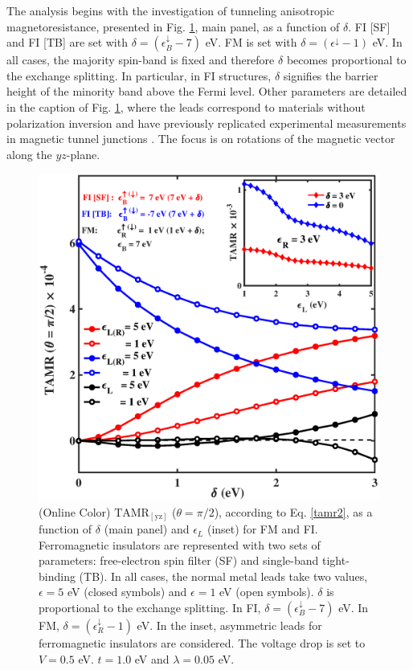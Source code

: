 \documentclass[10pt,pr,twocolumn,showpacs,amssymb,floatfix,superscriptaddress]{revtex4-1}
\newcommand{\eps}{\epsilon}
\newcommand{\lam}{\lambda}
\begin{document}
The analysis begins with the investigation of tunneling anisotropic magnetoresistance, presented in Fig. \ref{fig:figu2}, main panel, as a function of $\delta$. FI [SF] and FI [TB] are set with $\delta = (\epsilon_B^\downarrow - 7)$ eV. FM is set with $\delta = (\epsilon^\downarrow - 1)$ eV. In all cases, the majority spin-band is fixed and therefore $\delta$ becomes proportional to the exchange splitting.
In particular, in FI structures,  $\delta$ signifies the barrier height of the minority band above the Fermi level. Other parameters are detailed in the caption of Fig. \ref{fig:figu2}, where the leads correspond to materials without polarization inversion and have previously replicated experimental measurements in magnetic tunnel junctions \cite{kalitsov}. The focus is on rotations of the magnetic vector along the $yz$-plane.
\begin{figure}
\centering
\includegraphics[width=1.0\columnwidth,clip=false]{fig2.eps}
\caption{(Online Color) $\text{TAMR}_{[\text{yz}]}$ ($\theta = \pi/2$), according to Eq. \eqref{tamr2}, as a function of  $\delta$ (main panel) and $\eps_L$ (inset) for FM and FI. Ferromagnetic insulators are represented with two sets of parameters: free-electron spin filter (SF) and  single-band tight-binding (TB). In all cases, the normal metal leads take two values, $\eps= 5$ eV (closed symbols) and $\eps= 1$ eV (open symbols). $\delta$ is proportional to the exchange splitting. In FI, $\delta =(\eps^\downarrow_B - 7)$ eV. In FM,  $\delta =(\eps^\downarrow_R - 1)$ eV. In the inset, asymmetric leads for ferromagnetic insulators are considered. The voltage drop is set to $V = 0.5$ eV. $t=1.0$ eV and $\lam = 0.05$ eV.}
\label{fig:figu2}
\end{figure}
\end{document}
